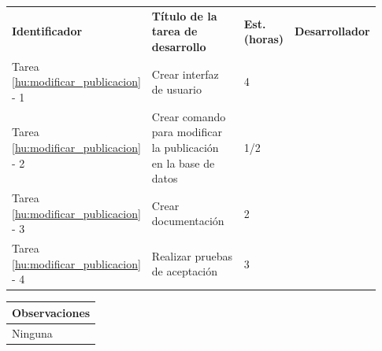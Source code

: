 \documentclass[11pt]{article}
\begin{document}
\vspace{-0.8cm}
\begin{longtable}{p{0.18\linewidth}|p{0.48\linewidth}|p{0.1\linewidth}|p{0.17\linewidth}}
  \toprule
  \textbf{Identificador} & \textbf{Título de la tarea de desarrollo} & \textbf{Est. (horas)} & \textbf{Desarrollador} \\
  Tarea \ref{hu:modificar_publicacion} - 1 & Crear interfaz de usuario & 4 &\\
  Tarea \ref{hu:modificar_publicacion} - 2 & Crear comando para  modificar la publicación en la base de datos  & 1/2 & \\
  Tarea \ref{hu:modificar_publicacion} - 3 & Crear documentación & 2 & \\
  Tarea \ref{hu:modificar_publicacion} - 4 & Realizar pruebas de aceptación & 3 &  \\
  \bottomrule
\end{longtable}
\vspace{-0.8cm}
\begin{longtable}{p{1.028\linewidth}}
  \textbf{Observaciones}\\
  \midrule
  Ninguna\\
  \bottomrule
\end{longtable}
\end{document}

